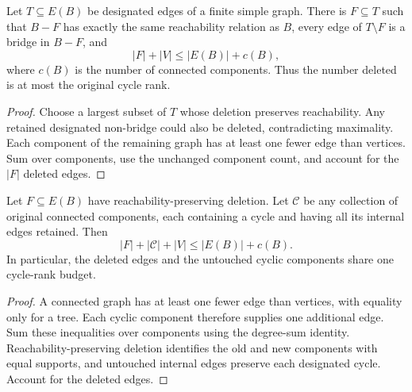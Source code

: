 \begin{theorem}
  \label{thm:lowerbounds-algebraic-cycle-edge-selection}
  \leanok
  Let $T\subseteq E(B)$ be designated edges of a finite simple graph.
  There is $F\subseteq T$ such that $B-F$ has exactly the same
  reachability relation as $B$, every edge of $T\setminus F$ is a bridge
  in $B-F$, and
  \[
    |F|+|V|\le |E(B)|+c(B),
  \]
  where $c(B)$ is the number of connected components. Thus the number
  deleted is at most the original cycle rank.
\end{theorem}
\begin{proof}
  \leanok
  Choose a largest subset of $T$ whose deletion preserves reachability.
  Any retained designated non-bridge could also be deleted, contradicting
  maximality. Each component of the remaining graph has at least one fewer
  edge than vertices. Sum over components, use the unchanged component
  count, and account for the $|F|$ deleted edges.
\end{proof}

\begin{theorem}
  \label{thm:lowerbounds-algebraic-cycle-rank-reserve}
  \leanok
  Let $F\subseteq E(B)$ have reachability-preserving deletion. Let
  $\mathcal C$ be any collection of original connected components,
  each containing a cycle and having all its internal edges retained.
  Then
  \[
    |F|+|\mathcal C|+|V|\le |E(B)|+c(B).
  \]
  In particular, the deleted edges and the untouched cyclic components
  share one cycle-rank budget.
\end{theorem}
\begin{proof}
  \leanok
  A connected graph has at least one fewer edge than vertices, with
  equality only for a tree. Each cyclic component therefore supplies
  one additional edge. Sum these inequalities over components using
  the degree-sum identity. Reachability-preserving deletion identifies
  the old and new components with equal supports, and untouched internal
  edges preserve each designated cycle. Account for the deleted edges.
\end{proof}

